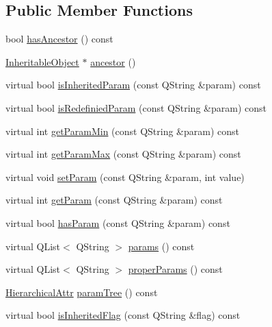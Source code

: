 \subsection*{\-Public \-Member \-Functions}
\begin{DoxyCompactItemize}
\item 
bool \hyperlink{class_inheritable_object_adcbc6cc43d5f999e9c7758f2c15d06da}{has\-Ancestor} () const 
\item 
\hyperlink{class_inheritable_object}{\-Inheritable\-Object} $\ast$ \hyperlink{class_inheritable_object_a10eead70368227b7f15f44f91d234fa5}{ancestor} ()
\item 
virtual bool \hyperlink{class_inheritable_object_a19c749cb2ced87af1b9c0f95920ad60e}{is\-Inherited\-Param} (const \-Q\-String \&param) const 
\item 
virtual bool \hyperlink{class_inheritable_object_abe7d327b43331cd5532c1c8228d63a4e}{is\-Redefinied\-Param} (const \-Q\-String \&param) const 
\item 
virtual int \hyperlink{class_inheritable_object_aa2f45895bcf254ef252428980c06da83}{get\-Param\-Min} (const \-Q\-String \&param) const 
\item 
virtual int \hyperlink{class_inheritable_object_a1edd964a7d01692414ef90f3e88c6a5e}{get\-Param\-Max} (const \-Q\-String \&param) const 
\item 
virtual void \hyperlink{class_inheritable_object_af3ebe709ead7a86ed2eaee602f1ffb67}{set\-Param} (const \-Q\-String \&param, int value)
\item 
virtual int \hyperlink{class_inheritable_object_a85fdb93d54f9e561acf5effa8012abb8}{get\-Param} (const \-Q\-String \&param) const 
\item 
virtual bool \hyperlink{class_inheritable_object_a1f6ee8bcd7cb2e92e260d535518778fc}{has\-Param} (const \-Q\-String \&param) const 
\item 
virtual \-Q\-List$<$ \-Q\-String $>$ \hyperlink{class_inheritable_object_a48233a132cc55bce9f73ca6d2dc7d657}{params} () const 
\item 
virtual \-Q\-List$<$ \-Q\-String $>$ \hyperlink{class_inheritable_object_a6b7782357091c81101b20fb6ca669eb0}{proper\-Params} () const 
\item 
\hyperlink{gameobject_8h_a2679b210263ad72f002dee6909ea222b}{\-Hierarchical\-Attr} \hyperlink{class_inheritable_object_a6bbe68c492529414211ddc8704640d13}{param\-Tree} () const 
\item 
virtual bool \hyperlink{class_inheritable_object_abaae23f6ff5781212a88a5faa4f9ed44}{is\-Inherited\-Flag} (const \-Q\-String \&flag) const 

\end{DoxyCompactItemize}
